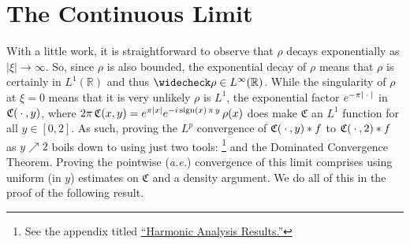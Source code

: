 \documentclass[../dissertation.tex]{subfiles}
\begin{document}
\section{The Continuous Limit}\label{sec3:ContPart}


With a little work, it is straightforward to observe that $\rho$ decays exponentially 
as $|\xi| \to \infty$. So, since $\rho$ is also bounded, the exponential decay of $\rho$
means that $\rho$ is certainly in $L^1(\mathbb R)$ and thus 
$\wc \rho \in L^\infty(\mathbb R)$. While the singularity of $\rho$ at $\xi = 0$ means 
that it is very unlikely $\rho$ is $L^1$, the exponential factor $e^{-\pi|\kern 0.5ex \cdot \kern 0.5ex|}$ 
in $\mathfrak C(\kern 0.5ex \cdot \kern 0.5ex, y)$, where 
$2\pi \, \mathfrak C(x, y) = e^{\pi|x|} e^{-i\operatorname{sign}(x)\, \pi\, y} \, \rho(x)$ does make 
$\mathfrak C$ an 
$L^1$ function for all $y \in [0, 2]$. As such, proving the $L^p$ convergence
of $\mathfrak C(\kern 0.5ex \cdot \kern 0.5ex, y) * f$ to $\mathfrak C(\kern 0.5ex \cdot \kern 0.5ex, 2) * f$ as $y\nearrow 2$ boils 
down to using 
just two tools: \cite[Theorem 1.2.10]{Grafakos}\footnote{\label{note1}See the appendix
titled \hyperref[app:HA]{``Harmonic Analysis Results.''}}
and the Dominated Convergence
Theorem. Proving the pointwise (\textit{a.e.}) convergence of this limit comprises
using uniform (in $y$) estimates on $\mathfrak C$ and a density argument. 
We do all of this in the proof of the following result.
\end{document}

